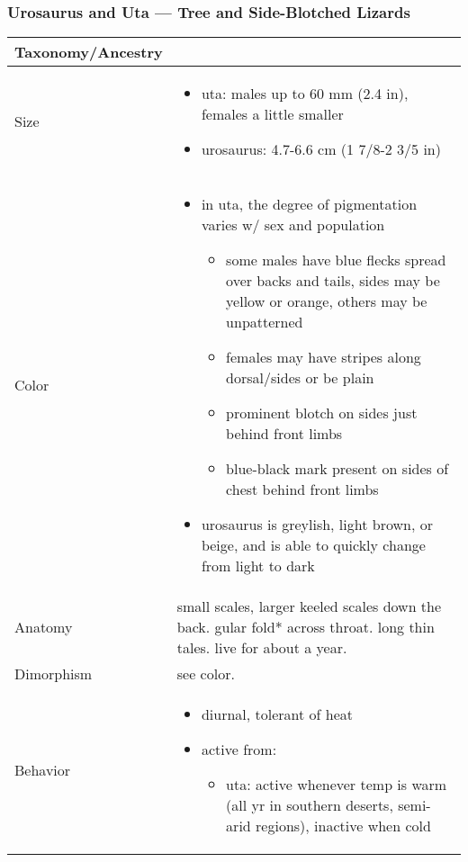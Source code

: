 \subsubsection{Urosaurus and Uta --- Tree and Side-Blotched Lizards}
\begin{center}
\begin{longtabu} to 

	\hline
	Taxonomy/Ancestry &
	
	 \\
	\hline
	Size & 
	\begin{itemize}[noitemsep]
		\item uta: males up to 60 mm (2.4 in), females a little smaller
		\item urosaurus: 4.7-6.6 cm (1 7/8-2 3/5 in)
	\end{itemize}
	\\
	\hline
	Color &
	\begin{itemize}[noitemsep]
		\item in uta, the degree of pigmentation varies w/ sex and population
			\begin{itemize}[noitemsep]
				\item some males have blue flecks spread over backs and tails, sides may be yellow or orange, others may be unpatterned
				\item females may have stripes along dorsal/sides or be plain
				\item prominent blotch on sides just behind front limbs
				\item blue-black mark present on sides of chest behind front limbs
			\end{itemize}
		\item urosaurus is greylish, light brown, or beige, and is able to quickly change from light to dark
	\end{itemize}
	 \\
	\hline
	Anatomy &
	small scales, larger keeled scales down the back. gular fold* across throat. long thin tales. live for about a year.
	 \\
	\hline
	Dimorphism & 
	see color.
	\\
	\hline
	Behavior & 
	\begin{itemize}[noitemsep]
		\item diurnal, tolerant of heat
		\item active from:
			\begin{itemize}[noitemsep]
				\item uta: active whenever temp is warm (all yr in southern deserts, semi-arid regions), inactive when cold

\end{itemize}
\end{itemize}
\end{longtabu}
\end{center}
